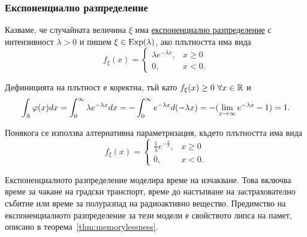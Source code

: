 \documentclass[numbers=endperiod, DIV=15, bibliography=totocnumbered]{scrartcl}
\begin{document}
\subsubsection{Експоненциално разпределение}\label{dist:exp}

\begin{definition}
  Казваме, че случайната величина $\xi$ има \uline{експоненциално разпределение} с интензивност $\lambda > 0$ и пишем $\xi \in \operatorname{Exp}(\lambda)$, ако плътността има вида
  \begin{displaymath}
    f_\xi(x) = \begin{cases}
      \lambda e^{-\lambda x}, & x \geq 0 \\
      0, &x < 0.
    \end{cases}
  \end{displaymath}

  Дефиницията на плътност е коректна, тъй като $f_\xi(x) \geq 0~\forall x \in \mathbb{R}$ и
  \begin{displaymath}
    \int_{\mathbb{R}} \varphi(x) dx
    =
    \int_0^\infty \lambda e^{-\lambda x} dx
    =
    -\int_0^\infty e^{-\lambda x} d(-\lambda x)
    =
    -(\lim_{x \to \infty} e^{-\lambda x} - 1)
    =
    1.
  \end{displaymath}

  Понякога се използва алтернативна параметризация, където плътността има вида
  \begin{displaymath}
    f_\xi(x) = \begin{cases}
      \frac 1 \lambda e^{-\frac x \lambda}, & x \geq 0 \\
      0, &x < 0.
    \end{cases}
  \end{displaymath}
\end{definition}

Експоненциалното разпределение моделира време на изчакване. Това включва време за чакане на градски транспорт, време до настъпване на застрахователно събитие или време за полуразпад на радиоактивно вещество. Предимство на експоненциалното разпределение за тези модели е свойството липса на памет, описано в теорема~\ref{thm:memorylessness}.
\end{document}
